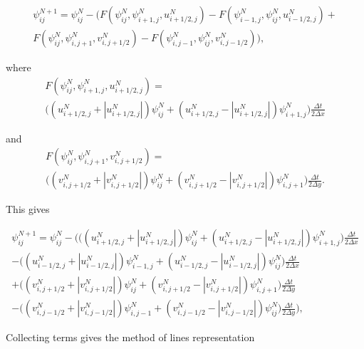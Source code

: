 \documentclass[12pt, a4paper]{article}
\newcommand{\abs}[1]{\left\lvert#1\right\rvert}
\begin{document}
\begin{multline}
 \psi_{ij}^{N+1} = \psi_{ij}^N - \Big( F \left( \psi_{ij}^N,\psi_{i+1,j}^N,u_{i+1/2,j}^N\right) 
-F \left( \psi_{i-1,j}^N,\psi_{ij}^N,u_{i-1/2,j}^N\right) + \\ F \left( \psi_{ij}^N,\psi_{i,j+1}^N,v_{i,j+1/2}^N\right) -F \left( \psi_{i,j-1}^N,\psi_{ij}^N,v_{i,j-1/2}^N\right) \Big),
\end{multline}

where
\begin{multline}
F \left( \psi_{ij}^N,\psi_{i+1,j}^N,u_{i+1/2,j}^N\right) =\\ 
\Big( \left( u_{i+1/2,j}^N + \abs{u_{i+1/2,j}^N} \right) \psi_{ij}^N 
+ \left( u_{i+1/2,j}^N - \abs{u_{i+1/2,j}^N} \right) \psi_{i+1,j}^N \Big)
\frac{\Delta t}{2 \Delta x}
\end{multline}

and
\begin{multline}
F \left( \psi_{ij}^N,\psi_{i,j+1}^N,v_{i,j+1/2}^N\right) =\\ 
\Big( \left( v_{i,j+1/2}^N + \abs{v_{i,j+1/2}^N} \right) \psi_{ij}^N 
+ \left( v_{i,j+1/2}^N - \abs{v_{i,j+1/2}^N} \right) \psi_{i,j+1}^N \Big)
\frac{\Delta t}{2 \Delta y}.
\end{multline}

This gives

\begin{multline}
 \psi_{ij}^{N+1} = \psi_{ij}^N - \Big( \Big( \left( u_{i+1/2,j}^N + \abs{u_{i+1/2,j}^N} \right) \psi_{ij}^N 
+ \left( u_{i+1/2,j}^N - \abs{u_{i+1/2,j}^N} \right) \psi_{i+1,j}^N \Big)
\frac{\Delta t}{2 \Delta x} \\
-\Big( \left( u_{i-1/2,j}^N + \abs{u_{i-1/2,j}^N} \right) \psi_{i-1,j}^N 
+ \left( u_{i-1/2,j}^N - \abs{u_{i-1/2,j}^N} \right) \psi_{ij}^N \Big)
\frac{\Delta t}{2 \Delta x} \\
 + \Big( \left( v_{i,j+1/2}^N + \abs{v_{i,j+1/2}^N} \right) \psi_{ij}^N 
+ \left( v_{i,j+1/2}^N - \abs{v_{i,j+1/2}^N} \right) \psi_{i,j+1}^N \Big)
\frac{\Delta t}{2 \Delta y} \\
 -\Big( \left( v_{i,j-1/2}^N + \abs{v_{i,j-1/2}^N} \right) \psi_{i,j-1}^N 
+ \left( v_{i,j-1/2}^N - \abs{v_{i,j-1/2}^N} \right) \psi_{ij}^N \Big)
\frac{\Delta t}{2 \Delta y} \Big),
\end{multline}

Collecting terms gives the method of lines representation
\end{document}
